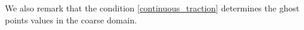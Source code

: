   We also remark that the condition \eqref{continuous_traction} determines the ghost points values in the coarse domain. 

